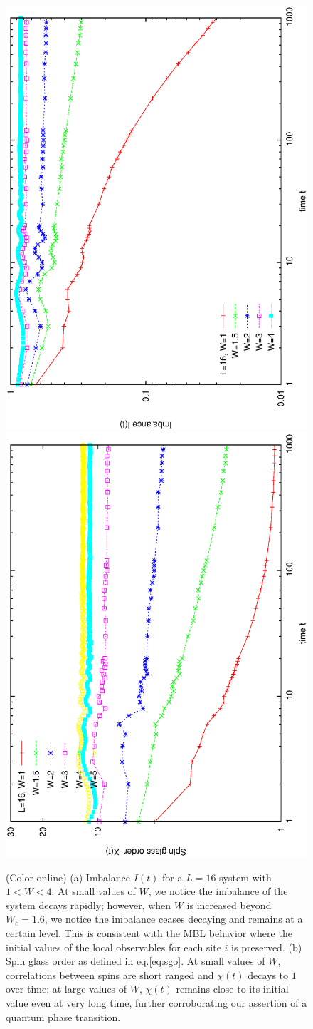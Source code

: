 \documentclass[prl,aps,epsf,showpacs,twocolumn,letterpaper]{revtex4}
\begin{document}
\begin{figure}[h]
	\includegraphics[angle=-90,width=3.in]{newfig2a.ps}\\
	\vspace{-0.0in}
	\includegraphics[angle=-90,width=3.in]{newfig2b.ps}\\
	\hspace{0.0in}
	\vspace{-0.in}
	\caption{
		(Color online) (a) Imbalance $I(t)$ for a $L=16$ system with $1 < W < 4$.  At small values of $W$, we notice the imbalance of the system decays rapidly; however, when $W$ is increased beyond $W_c = 1.6$, we notice the imbalance ceases decaying and remains at a certain level.  This is consistent with the MBL behavior where the initial values of the local observables for each site $i$ is preserved. (b) Spin glass order as defined in eq.\ref{eq:sgo}. At small values of $W$, correlations between spins are short ranged and $\chi(t)$ decays to $1$ over time; at large values of $W$, $\chi(t)$ remains close to its initial value even at very long time, further corroborating our assertion of a quantum phase transition.}
	\label{fig4}
\end{figure}
\end{document}
